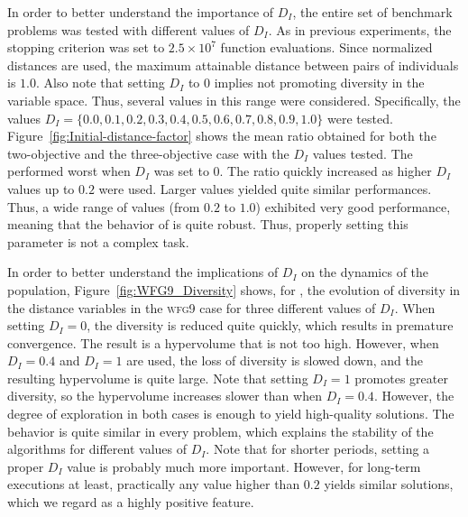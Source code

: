 In order to better understand the importance of $D_I$, the entire set of benchmark problems was tested with different values
of $D_I$.
%
As in previous experiments, the stopping criterion was set to $2.5 \times 10^7$ function evaluations.
%
Since normalized distances are used, the maximum attainable distance between pairs of individuals is $1.0$.
%
Also note that setting $D_I$ to $0$ implies not promoting diversity in the variable space.
%
Thus, several values in this range were considered.
%
Specifically, the values $D_I = \{0.0, 0.1, 0.2, 0.3, 0.4, 0.5, 0.6, 0.7, 0.8, 0.9, 1.0\}$ were tested.
%
Figure~\ref{fig:Initial-distance-factor} shows the mean \HV{} ratio obtained for both the two-objective 
and the three-objective case with the $D_I$ values tested.
%
The \AVSDMOEAD{} performed worst when $D_I$ was set to $0$.
%
The \HV{} ratio quickly increased as higher $D_I$ values up to $0.2$ were used.
%
Larger values yielded quite similar performances.
%
Thus, a wide range of values (from $0.2$ to $1.0$) exhibited very good performance, 
meaning that the behavior of \AVSDMOEAD{} is quite robust.
%
Thus, properly setting this parameter is not a complex task.

In order to better understand the implications of $D_I$ on the dynamics of the population, Figure~\ref{fig:WFG9_Diversity}
shows, for \AVSDMOEAD{}, the evolution of diversity in the distance variables in the \textsc{wfg9} case for three different values of $D_I$.
%
When setting $D_I = 0$, the diversity is reduced quite quickly, which results in premature convergence.
%
The result is a hypervolume that is not too high.
%
However, when $D_I = 0.4$ and $D_I = 1$ are used, the loss of diversity is slowed down, and the resulting hypervolume is quite large.
%
Note that setting $D_I = 1$ promotes greater diversity, so the hypervolume increases slower than when
$D_I = 0.4$.
%
However, the degree of exploration in both cases is enough to yield high-quality solutions.
%
The behavior is quite similar in every problem, which explains the stability of the algorithms for
different values of $D_I$.
%
Note that for shorter periods, setting a proper $D_I$ value is probably much more important.
%
However, for long-term executions at least, practically any value higher than $0.2$ yields similar solutions,
which we regard as a highly positive feature.


